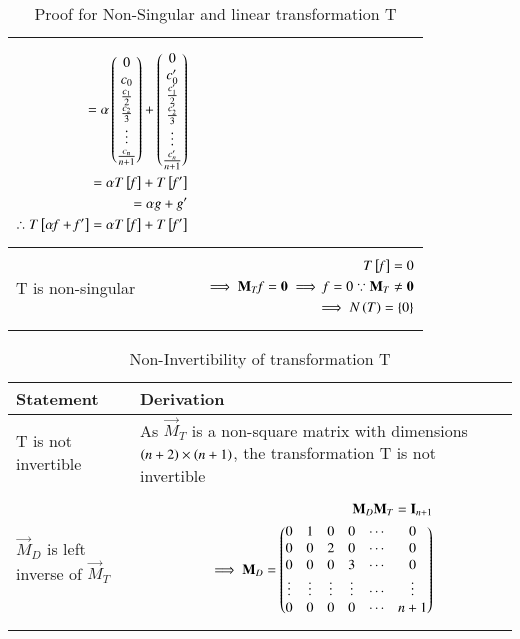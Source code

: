 \begin{table*}[ht!]
\begin{center}
\begin{tabular}{|l|l|}
{\begin{align}
=\alpha\begin{pmatrix}0\\c_0\\\frac{c_1}{2}\\\frac{c_2}{3}\\\vdots\\\frac{c_n}{n+1}\end{pmatrix}+\begin{pmatrix}0\\c_0^\prime\\\frac{c_1^\prime}{2}\\\frac{c_2^\prime}{3}\\\vdots\\\frac{c_n^\prime}{n+1}\end{pmatrix}\\
=\alpha T{}\left[\mathit{f}\right]+T{}\left[\mathit{f^\prime}\right]\\
=\alpha\mathit{g}+\mathit{g^\prime}\\
\therefore T{}\left[\alpha\mathit{f}+\mathit{f^\prime}\right]=\alpha T{}\left[\mathit{f}\right]+T{}\left[\mathit{f^\prime}\right]
\end{align}}
\\ [0.5ex] 
\hline
T is non-singular & \parbox{10cm}{\begin{align}
T{}\left[\mathit{f}\right]=0\\
\implies \mathbf{M}_T\mathit{f}=\mathbf{0}
\implies \mathit{f}=0 \because \mathbf{M}_T \ne \mathbf{0}\\
\implies N\left(T\right)=\left\{0\right\}
\end{align}}
\\ [0.5ex] 
\hline
\end{tabular}
\caption{Proof for Non-Singular and linear transformation T}
\label{eq:solutions/4/1/9/a/table:2}
\end{center}

\end{table*}

\begin{table*}[ht!]
\begin{center}
\begin{tabular}{|p{4.7cm}|p{10cm}|}
\hline
\textbf{Statement} & \textbf{Derivation} \\[0.5ex]
\hline
T is not invertible & As $\vec{M}_T$ is a non-square matrix with dimensions $\left(n+2\right)\times\left(n+1\right)$, the transformation T is not invertible
\\ [0.5ex] 
\hline
$\vec{M}_D$ is left inverse of $\vec{M}_T$ 
& \parbox{10cm}{\begin{align}
\mathbf{M}_D\mathbf{M}_T=\mathbf{I}_{n+1}\\
\implies \mathbf{M}_D=\begin{pmatrix}0&1&0&0&\cdots&0\\0&0&2&0&\cdots&0\\0&0&0&3&\cdots&0\\\vdots&\vdots&\vdots&\vdots&\cdots&\vdots\\0&0&0&0&\cdots&n+1\end{pmatrix}
\end{align}}
\\ [0.5ex] 
\hline
\end{tabular}
\caption{Non-Invertibility of transformation T}
\label{eq:solutions/4/1/9/a/table:3}
\end{center}
\end{table*}


